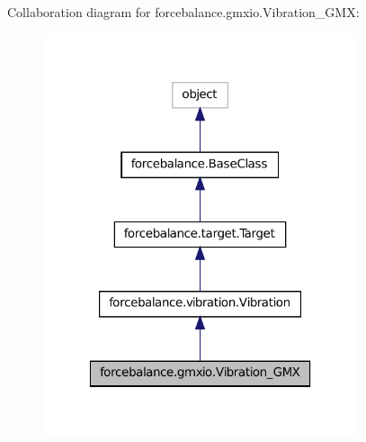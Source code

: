 Collaboration diagram for forcebalance.\-gmxio.\-Vibration\-\_\-\-G\-M\-X\-:
\nopagebreak
\begin{figure}[H]
\begin{center}
\leavevmode
\includegraphics[width=262pt]{classforcebalance_1_1gmxio_1_1Vibration__GMX__coll__graph}
\end{center}
\end{figure}
